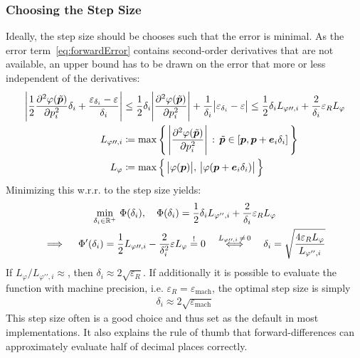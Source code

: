 			\subsubsection{Choosing the Step Size}
				Ideally, the step size should be chooses such that the error is minimal. As the error term~\eqref{eq:forwardError} contains second-order derivatives that are not available, an upper bound has to be drawn on the error that more or less independent of the derivatives:
				\begin{align*}
					\Bigg\lvert \frac{1}{2} \pdv[2]{\varphi(\tilde{\bm{p}})}{p_i} \delta_i + \frac{\varepsilon_{\delta_i} - \varepsilon}{\delta_i} \Bigg\rvert
					                           & \leq \frac{1}{2} \delta_i \Bigg\lvert \pdv[2]{\varphi(\tilde{\bm{p}})}{p_i} \Bigg\rvert + \frac{1}{\delta_i} \big\lvert \varepsilon_{\delta_i} - \varepsilon \big\rvert
					\leq \frac{1}{2} \delta_i L_{\varphi\prime\prime, i} + \frac{2}{\delta_i} \varepsilon_R L_\varphi                                                                                                     \\
					L_{\varphi\prime\prime, i} & \coloneqq \max\Bigg\{\, \Bigg\lvert \pdv[2]{\varphi(\tilde{\bm{p}})}{p_i} \Bigg\rvert \,:\, \tilde{\bm{p}} \in [\bm{p}, \bm{p} + \bm{e}_i \delta_i] \,\Bigg\}       \\
					L_\varphi                  & \coloneqq \max\Big\{\, \big\lvert \varphi(\bm{p}) \big\rvert,\, \big\lvert \varphi(\bm{p} + \bm{e}_i \delta_i) \big\rvert \,\Big\}
				\end{align*}
				Minimizing this w.r.r. to the step size yields:
				\begin{gather*}
					\min_{\delta_i \in \mathbb{R}^+} \, \Phi(\delta_i),\quad \Phi(\delta_i) = \frac{1}{2} \delta_i L_{\varphi'', i} + \frac{2}{\delta_i} \varepsilon_R L_\varphi \\
					\implies\quad \Phi'(\delta_i) = \frac{1}{2} L_{\varphi\prime\prime, i} - \frac{2}{\delta_i^2} \varepsilon L_\varphi \overset{!}{=} 0
					\quad\overset{L_{\varphi\prime\prime, i} \,\neq\, 0}{\iff}\quad \delta_i = \sqrt{\frac{4 \varepsilon_R L_\varphi}{L_{\varphi'', i}}}
				\end{gather*}
				If \( L_\varphi / L_{\varphi\prime\prime, i} \approx \), then \( \delta_i \approx 2 \sqrt{\varepsilon_R} \). If additionally it is possible to evaluate the function with machine precision, i.e. \( \varepsilon_R = \varepsilon_\mathrm{mach} \), the optimal step size is simply
				\begin{align*}
					\delta_i \approx 2 \sqrt{\varepsilon_\mathrm{mach}}
				\end{align*}
				This step size often is a good choice and thus set as the default in most implementations. It also explains the rule of thumb that forward-differences can approximately evaluate half of decimal places correctly.

